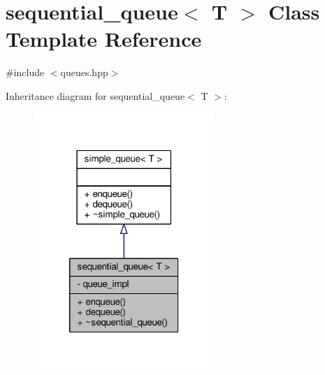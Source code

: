 \hypertarget{classsequential__queue}{\section{sequential\-\_\-queue$<$ T $>$ Class Template Reference}
\label{classsequential__queue}
}


{\ttfamily \#include $<$queues.\-hpp$>$}



Inheritance diagram for sequential\-\_\-queue$<$ T $>$\-:
\nopagebreak
\begin{figure}[H]
\begin{center}
\leavevmode
\includegraphics[width=194pt]{classsequential__queue__inherit__graph}
\end{center}
\end{figure}


